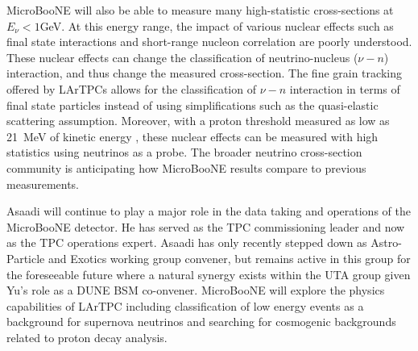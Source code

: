 MicroBooNE will also be able to measure many high-statistic cross-sections at $E_{\nu} < 1$GeV. At this energy range, the impact of various nuclear effects such as final state interactions and short-range nucleon correlation are poorly understood. These nuclear effects can change the classification of neutrino-nucleus ($\nu-n$) interaction, and thus change the measured cross-section. The fine grain tracking offered by LArTPCs allows for the classification of $\nu-n$ interaction in terms of final state particles instead of using simplifications such as the quasi-elastic scattering assumption. Moreover, with a proton threshold measured as low as 21~MeV of kinetic energy \cite{Argoneut}, these nuclear effects can be measured with high statistics using neutrinos as a probe. The broader neutrino cross-section community is anticipating how MicroBooNE results compare to previous measurements.


\label{sec:UbooneOperations}
Asaadi will continue to play a major role in the data taking and operations of the MicroBooNE detector.  He has served as the TPC commissioning leader and now as the TPC operations expert. Asaadi has only recently stepped down as Astro-Particle and Exotics working group convener, but remains active in this group for the foreseeable future where a natural synergy exists within the UTA group given Yu's role as a DUNE BSM co-onvener. MicroBooNE will explore the physics capabilities of LArTPC including classification of low energy events as a background for supernova neutrinos and searching for cosmogenic backgrounds related to proton decay analysis.

